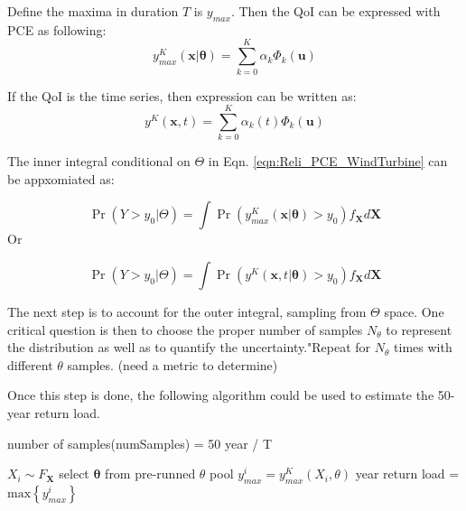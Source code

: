 \documentclass[twocolumn,10pt]{asme2e}
\newcommand{\bs}[1]{\boldsymbol{#1}}
\begin{document}
Define the maxima in duration $T$ is $y_{max}$. Then the QoI can be expressed with PCE as following:
\begin{equation}
  y_{max}^K (\bs{x} | \bs{\theta}) = \sum _{k=0}^K \alpha_k \Phi_k(\bs{u})
  \label{eqn:Block_maxima_PCE}
\end{equation}

If the QoI is the time series, then expression can be written as:
\begin{equation}
  y^K(\bs{x},t) = \sum _{k=0} ^ K \alpha_k (t) \Phi_k(\bs{u})
  \label{eqn:TimeSeries_PCE}
\end{equation}

The inner integral conditional on $\Theta$ in Eqn. \ref{eqn:Reli_PCE_WindTurbine} can be appxomiated as:

\begin{equation}
  \Pr \left( Y > y_0 | \Theta \right)  = \int \Pr \left( y_{max}^K (\bs{x}|\bs{\theta}) > y_0 \right) f_{\bs{X}} d \bs{X}
  \label{eqn:Reli_BM_PCE}
\end{equation}
Or

\begin{equation}
  \Pr \left( Y > y_0 | \Theta \right)  = \int \Pr \left( y^K (\bs{x},t|\bs{\theta}) > y_0 \right) f_{\bs{X}} d \bs{X}
  \label{eqn:Reli_TS_PCE}
\end{equation}

The next step is to account for the outer integral, sampling from $\Theta$ space. One critical question is then to choose the proper number of samples $N_\theta$ to represent the distribution as well as to quantify the uncertainty."Repeat for $N_\theta$ times with different $\theta$ samples. (need a metric to determine)

Once this step is done, the following algorithm could be used to estimate the 50-year return load.

number of samples(numSamples) = 50 year / T \\
\begin{algorithm}
  \begin{algorithmic}
	  \State $X_i \sim F_{\bs{X}}$
	  \State select $\bs{\theta}$ from pre-runned $\theta$ pool
	  \State $y_{max}^i = y_{max}^K (X_i, \theta)$
	\EndFor
	 year return load = $\mathrm{max } \left\{ y_{max}^i \right\}$
  \end{algorithmic}
\end{algorithm}
\end{document}
